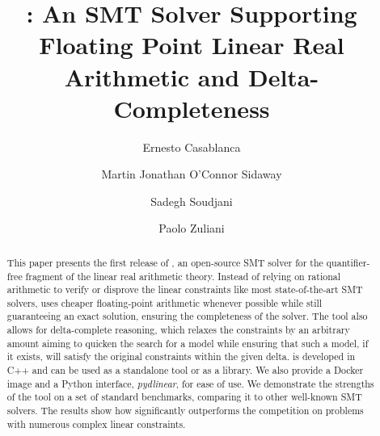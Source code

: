 \documentclass[runningheads]{llncs}
\begin{document}
\title{\dlinear: An SMT Solver Supporting Floating Point Linear Real Arithmetic and Delta-Completeness}
\titlerunning{\dlinear}

\author{Ernesto Casablanca
    \and
    Martin Jonathan O'Connor Sidaway
    \and
    Sadegh Soudjani
    \and
    Paolo Zuliani
}



\maketitle

\begin{abstract}
    This paper presents the first release of \dlinear, an open-source SMT solver for the quantifier-free fragment of the linear real arithmetic theory.
    Instead of relying on rational arithmetic to verify or disprove the linear constraints like most state-of-the-art SMT solvers, \dlinear uses cheaper floating-point arithmetic whenever possible while still guaranteeing an exact solution, ensuring the completeness of the solver.
    The tool also allows for delta-complete reasoning, which relaxes the constraints by an arbitrary amount aiming to quicken the search for a model while ensuring that such a model, if it exists, will satisfy the original constraints within the given delta.
    \dlinear is developed in C++ and can be used as a standalone tool or as a library. We also provide a Docker image and a Python interface, \textit{pydlinear}, for ease of use.
    We demonstrate the strengths of the tool on a set of standard benchmarks, comparing it to other well-known SMT solvers.
    The results show how \dlinear significantly outperforms the competition on problems with numerous complex linear constraints.

\end{abstract}
\end{document}
